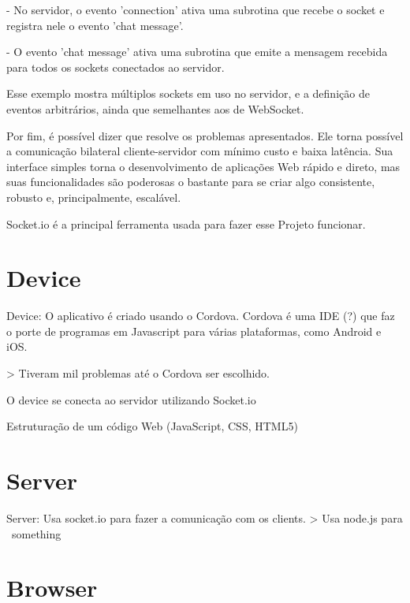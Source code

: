 \documentclass[a4paper,12pt]{article}
\begin{document}
- No servidor, o evento 'connection' ativa uma subrotina que recebe o socket e registra nele o evento 'chat message'.

- O evento 'chat message' ativa uma subrotina que emite a mensagem recebida para todos os sockets conectados ao servidor.

Esse exemplo mostra múltiplos sockets em uso no servidor, e a definição de eventos arbitrários, ainda que semelhantes aos de WebSocket.

Por fim, é possível dizer que resolve os problemas apresentados. Ele torna possível a comunicação bilateral cliente-servidor com mínimo custo e baixa latência. Sua interface simples torna o desenvolvimento de aplicações Web rápido e direto, mas suas funcionalidades são poderosas o bastante para se criar algo consistente, robusto e, principalmente, escalável.

Socket.io é a principal ferramenta usada para fazer esse Projeto funcionar.

\newpage

\section{Device}


Device:
  O aplicativo é criado usando o Cordova.
    Cordova é uma IDE (?) que faz o porte de programas em Javascript para várias plataformas, como Android e iOS.


    > Tiveram mil problemas até o Cordova ser escolhido.


  O device se conecta ao servidor utilizando Socket.io




Estruturação de um código Web (JavaScript, CSS, HTML5)







\section{Server}

Server:
  Usa socket.io para fazer a comunicação com os clients.
  > Usa node.js para ~something~









\section{Browser}
\end{document}
